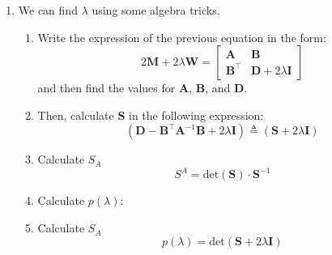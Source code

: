 \documentclass[letta4 paper]{article}
\numberwithin{equation}{section}
\newcommand{\0}{\mathbf{0}}
\begin{document}
\begin{enumerate}
\begin{enumerate}
		\item We can find $\lambda$ using some algebra tricks.
		\begin{enumerate}
			\item Write the expression of the previous equation in the form:
			\begin{equation}
			 2\mathbf{M} + 2 \lambda \mathbf{W} = 
			\begin{bmatrix}
				\mathbf{A} & \mathbf{B} \\
				\mathbf{B}^\intercal  & \mathbf{D} + 2 \lambda \mathbf{I} 
			\end{bmatrix} 
			\end{equation}
			and then find the values for $\mathbf{A}$, $\mathbf{B}$, and $\mathbf{D}$.
			
			\item Then, calculate $\mathbf{S}$ in the following expression:
			\begin{equation}
			 (\mathbf{D} - \mathbf{B}^\intercal \mathbf{A}^{-1} \mathbf{B} + 2 \lambda \mathbf{I}) \triangleq
			 (\mathbf{S} + 2 \lambda \mathbf{I})
			\end{equation}
			
			\item Calculate $S_A$
			\begin{equation}
			S^A = \textrm{det}(\mathbf{S})  \cdot \mathbf{S}^{-1}
			\end{equation}
			
			\item Calculate $p(\lambda)$:
			\item Calculate $S_A$
			\begin{equation}
			p(\lambda) = \textrm{det}(\mathbf{S}+ 2 \lambda \mathbf{I})
			\end{equation}
		

\end{enumerate}
\end{enumerate}
\end{enumerate}
\end{document}
